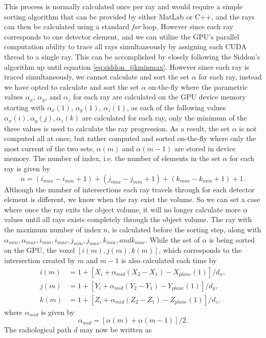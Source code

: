 This process is normally calculated once per ray and would require a simple sorting algorithm that can be provided by either MatLab or C++, and the rays can then be calculated using a standard \textit{for} loop.  However since each ray corresponds to one detector element, and we can utilize the GPU's parallel computation ability to trace all rays simultaneously by assigning each CUDA thread to a single ray.  This can be accomplished by closely following the Siddon's algorithm up until equation \ref{eq:siddon_ijkminmax}.  However since each ray is traced simultaneously, we cannot calculate and sort the set ${\alpha}$ for each ray, instead we have opted to calculate and sort the set ${\alpha}$ on-the-fly where the parametric values ${\alpha_x}$, ${\alpha_y}$, and ${\alpha_z}$ for each ray are calculated on the GPU device memory starting with $\alpha_x(1)$, $\alpha_y(1)$, $\alpha_z(1)$, as  each of the following values ${\alpha_x(i), \alpha_y(j), \alpha_z(k)}$ are calculated for each ray, only the minimum of the three values is used to calculate the ray progression.  As a result, the set ${\alpha}$ is not computed all at once, but rather computed and sorted on-the-fly where only the most current of the two sets, $\alpha(m)$ and 
$\alpha(m-1)$ are stored in device memory.  The number of index, i.e. the number of elements in the set ${\alpha}$ for each ray is given by 
\begin{equation}
n = (i_{max} - i_{min} + 1) + (j_{max} - j_{min}+1) + (k_{max}-k_{min}+1) + 1.
\label{eq:siddon_n}
\end{equation}
Although the number of intersections each ray travels through for each detector element is different, we know when the ray exist the volume.  So we can set a case where once the ray exits the object volume, it will no longer calculate more $\alpha$ values until all rays exists completely through the object volume.  The ray with the maximum number of index $n$, is calculated before the sorting step, along with $\alpha_{min}, \alpha_{max}, i_{min}, i_{max}, j_{min}, j_{max}, k_{min}, and k_{max}$.  While the set of ${\alpha}$ is being sorted on the GPU, the voxel $\left[ i(m), j(m), k(m) \right]$, which corresponds to the intersection created by $m$ and $m-1$ is also calculated each time by
\begin{equation}
\begin{aligned}
i(m) &= 1 + \left[ X_i + \alpha_{mid}(X_2 - X_1) - X_{plane}(1) \right] /d_x, \\
j(m) &= 1 + \left[ Y_i + \alpha_{mid}(Y_2 - Y_1) - Y_{plane}(1) \right] /d_y, \\
k(m) &= 1 + \left[ Z_i + \alpha_{mid}(Z_2 - Z_1) - Z_{plane}(1) \right] /d_z,
\end{aligned}
\label{eq:siddon_voxel}
\end{equation}
where $\alpha_{mid}$ is given by 
\begin{equation}
\alpha_{mid} = \left[ \alpha(m) + \alpha(m-1) \right] /2.
\label{eq:siddon_alphamid}
\end{equation}
The radiological path $d$ may now be written as 

